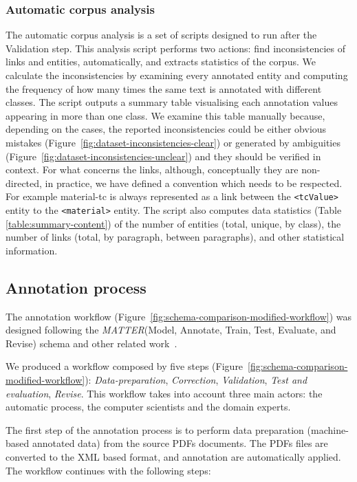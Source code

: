 \documentclass[fleqn,10pt]{wlscirep}
\begin{document}
\subsubsection*{Automatic corpus analysis}
The automatic corpus analysis is a set of scripts designed to run after the Validation step. 
This analysis script performs two actions: find inconsistencies of links and entities, automatically, and extracts statistics of the corpus. 
We calculate the inconsistencies by examining every annotated entity and computing the frequency of how many times the same text is annotated with different classes. 
The script outputs a summary table visualising each annotation values appearing in more than one class.
We examine this table manually because, depending on the cases, the reported inconsistencies could be either obvious mistakes (Figure~\ref{fig:dataset-inconsistencies-clear}) or generated by ambiguities (Figure~\ref{fig:dataset-inconsistencies-unclear}) and they should be verified in context. 
For what concerns the links, although, conceptually they are non-directed, in practice, we have defined a convention which needs to be respected. For example material-tc is always represented as a link between the \texttt{<tcValue>} entity to the \texttt{<material>} entity. 
The script also computes data statistics (Table \ref{table:summary-content}) of the number of entities (total, unique, by class), the number of links (total, by paragraph, between paragraphs), and other statistical information. 

\FloatBarrier
\subsection*{Annotation process}
\label{subsec:annotation-workflow}
The annotation workflow (Figure~\ref{fig:schema-comparison-modified-workflow}) was designed following the \textit{MATTER}(Model, Annotate, Train, Test, Evaluate, and Revise) schema\cite{pustejovsky2012natural}  and other related work~\cite{Dieb2016, Krallinger2015TheCC}.

We produced a workflow composed by five steps (Figure~\ref{fig:schema-comparison-modified-workflow}): \textit{Data-preparation}, \textit{Correction}, \textit{Validation}, \textit{Test and evaluation}, \textit{Revise}. 
This workflow takes into account three main actors: the automatic process, the computer scientists and the domain experts.

The first step of the annotation process is to perform data preparation (machine-based annotated data) from the source PDFs documents. 
The PDFs files are converted to the XML based format, and annotation are automatically applied. 
The workflow continues with the following steps: 
\end{document}
